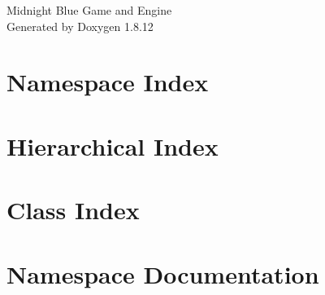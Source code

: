 \documentclass[twoside]{book}
\newcommand{\+}{\discretionary{\mbox{\scriptsize$\hookleftarrow$}}{}{}}
\newcommand{\clearemptydoublepage}{%
  \newpage{\pagestyle{empty}\cleardoublepage}%
}
\begin{document}
\hypersetup{pageanchor=false,
             bookmarksnumbered=true,
             pdfencoding=unicode
            }
\begin{titlepage}
\vspace*{7cm}
\begin{center}%
{\Large Midnight Blue Game and Engine }\\
\vspace*{1cm}
{\large Generated by Doxygen 1.8.12}\\
\end{center}
\end{titlepage}
\clearemptydoublepage
{}
\tableofcontents
\clearemptydoublepage
{}
\hypersetup{pageanchor=true}

\chapter{Namespace Index}

\chapter{Hierarchical Index}

\chapter{Class Index}

\chapter{Namespace Documentation}














\end{document}
